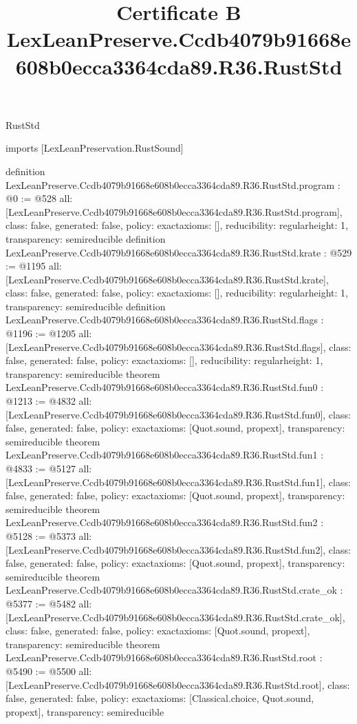 \begin{lexlean}{RustStd}
\title{Certificate B LexLeanPreserve.Ccdb4079b91668e608b0ecca3364cda89.R36.RustStd}
\begin{coremodule}
imports [LexLeanPreservation.RustSound]

definition LexLeanPreserve.Ccdb4079b91668e608b0ecca3364cda89.R36.RustStd.program : @0 := @528 {
  all: [LexLeanPreserve.Ccdb4079b91668e608b0ecca3364cda89.R36.RustStd.program],
  class: false,
  generated: false,
  policy: exact{axioms: []},
  reducibility: regular{height: 1},
  transparency: semireducible
}
definition LexLeanPreserve.Ccdb4079b91668e608b0ecca3364cda89.R36.RustStd.krate : @529 := @1195 {
  all: [LexLeanPreserve.Ccdb4079b91668e608b0ecca3364cda89.R36.RustStd.krate],
  class: false,
  generated: false,
  policy: exact{axioms: []},
  reducibility: regular{height: 1},
  transparency: semireducible
}
definition LexLeanPreserve.Ccdb4079b91668e608b0ecca3364cda89.R36.RustStd.flags : @1196 := @1205 {
  all: [LexLeanPreserve.Ccdb4079b91668e608b0ecca3364cda89.R36.RustStd.flags],
  class: false,
  generated: false,
  policy: exact{axioms: []},
  reducibility: regular{height: 1},
  transparency: semireducible
}
theorem LexLeanPreserve.Ccdb4079b91668e608b0ecca3364cda89.R36.RustStd.fun0 : @1213 := @4832 {
  all: [LexLeanPreserve.Ccdb4079b91668e608b0ecca3364cda89.R36.RustStd.fun0],
  class: false,
  generated: false,
  policy: exact{axioms: [Quot.sound, propext]},
  transparency: semireducible
}
theorem LexLeanPreserve.Ccdb4079b91668e608b0ecca3364cda89.R36.RustStd.fun1 : @4833 := @5127 {
  all: [LexLeanPreserve.Ccdb4079b91668e608b0ecca3364cda89.R36.RustStd.fun1],
  class: false,
  generated: false,
  policy: exact{axioms: [Quot.sound, propext]},
  transparency: semireducible
}
theorem LexLeanPreserve.Ccdb4079b91668e608b0ecca3364cda89.R36.RustStd.fun2 : @5128 := @5373 {
  all: [LexLeanPreserve.Ccdb4079b91668e608b0ecca3364cda89.R36.RustStd.fun2],
  class: false,
  generated: false,
  policy: exact{axioms: [Quot.sound, propext]},
  transparency: semireducible
}
theorem LexLeanPreserve.Ccdb4079b91668e608b0ecca3364cda89.R36.RustStd.crate_ok : @5377 := @5482 {
  all: [LexLeanPreserve.Ccdb4079b91668e608b0ecca3364cda89.R36.RustStd.crate_ok],
  class: false,
  generated: false,
  policy: exact{axioms: [Quot.sound, propext]},
  transparency: semireducible
}
theorem LexLeanPreserve.Ccdb4079b91668e608b0ecca3364cda89.R36.RustStd.root : @5490 := @5500 {
  all: [LexLeanPreserve.Ccdb4079b91668e608b0ecca3364cda89.R36.RustStd.root],
  class: false,
  generated: false,
  policy: exact{axioms: [Classical.choice, Quot.sound, propext]},
  transparency: semireducible
}


\end{coremodule}
\end{lexlean}
